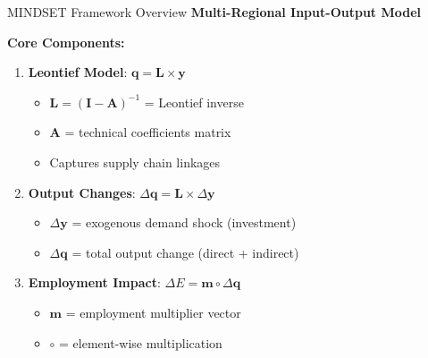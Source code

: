 \documentclass[10pt]{beamer}
\begin{document}
\begin{frame}{MINDSET Framework Overview}
\textbf{Multi-Regional Input-Output Model}

\vspace{0.3cm}

\textbf{Core Components:}
\begin{enumerate}
    \item \textbf{Leontief Model}: $\mathbf{q} = \mathbf{L} \times \mathbf{y}$
    \begin{itemize}
        \item $\mathbf{L} = (\mathbf{I} - \mathbf{A})^{-1}$ = Leontief inverse
        \item $\mathbf{A}$ = technical coefficients matrix
        \item Captures supply chain linkages
    \end{itemize}

    \vspace{0.2cm}

    \item \textbf{Output Changes}: $\Delta\mathbf{q} = \mathbf{L} \times \Delta\mathbf{y}$
    \begin{itemize}
        \item $\Delta\mathbf{y}$ = exogenous demand shock (investment)
        \item $\Delta\mathbf{q}$ = total output change (direct + indirect)
    \end{itemize}

    \vspace{0.2cm}

    \item \textbf{Employment Impact}: $\Delta E = \mathbf{m} \circ \Delta\mathbf{q}$
    \begin{itemize}
        \item $\mathbf{m}$ = employment multiplier vector
        \item $\circ$ = element-wise multiplication
    \end{itemize}
\end{enumerate}
\end{frame}
\end{document}
